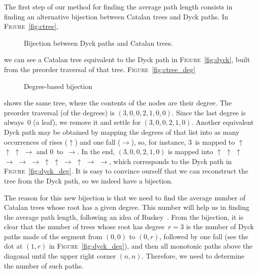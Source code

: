 \documentclass[11pt]{article}
\newcommand\fig{\textsc{Figure}}
\newcommand\Fig{\textsc{Figure}}
\begin{document}
The first step of our method for finding the average path length
consists in finding an alternative bijection between Catalan trees and
Dyck paths. In \fig~\ref{fig:ctree},
\begin{figure}
\centering
{}
\qquad\qquad
{}
\caption{Bijection between Dyck paths and Catalan trees.\label{fig:bijection}}
\end{figure}
we can see a Catalan tree equivalent to the Dyck path in
\fig~\ref{fig:dyck}, built from the preorder traversal of that
tree. \Fig~\ref{fig:ctree_deg}
\begin{figure}[b]
\centering
{}
\qquad
{}
\caption{Degree-based bijection}
\end{figure}
shows the same tree, where the contents of the nodes are their
degree. The preorder traversal (of the degrees) is \((3, 0, 0, 2, 1,
0, 0)\). Since the last degree is always~\(0\) (a leaf), we remove it
and settle for \((3, 0, 0, 2, 1, 0)\). Another equivalent Dyck path
may be obtained by mapping the degrees of that list into as many
occurrences of rises (\(\uparrow\)) and one fall (\(\rightarrow\)),
so, for instance, \(3\)~is mapped to \(\uparrow\) \(\uparrow\)
\(\uparrow\) \(\rightarrow\) and \(0\)~to~\(\rightarrow\). In the end,
\((3,0,0,2,1,0)\) is mapped into \(\uparrow\) \(\uparrow\)
\(\uparrow\) \(\rightarrow\) \(\rightarrow\) \(\rightarrow\)
\(\uparrow\) \(\uparrow\) \(\rightarrow\) \(\uparrow\) \(\rightarrow\)
\(\rightarrow\), which corresponds to the Dyck path in
\fig~\ref{fig:dyck_deg}. It is easy to convince ourself that we can
reconstruct the tree from the Dyck path, so we indeed have a
bijection.

The reason for this new bijection is that we need to find the average
number of Catalan trees whose root has a given degree. This number
will help us in finding the average path length, following an idea of
Ruskey~\cite{Ruskey:1983}. From the bijection, it is clear that the
number of trees whose root has degree~\(r=3\) is the number of Dyck
paths made of the segment from \((0,0)\) to \((0,r)\), followed by one
fall (see the dot at \((1,r)\) in \fig~\ref{fig:dyck_deg}), and then
all monotonic paths above the diagonal until the upper right corner
\((n,n)\). Therefore, we need to determine the number of such paths.
\end{document}
